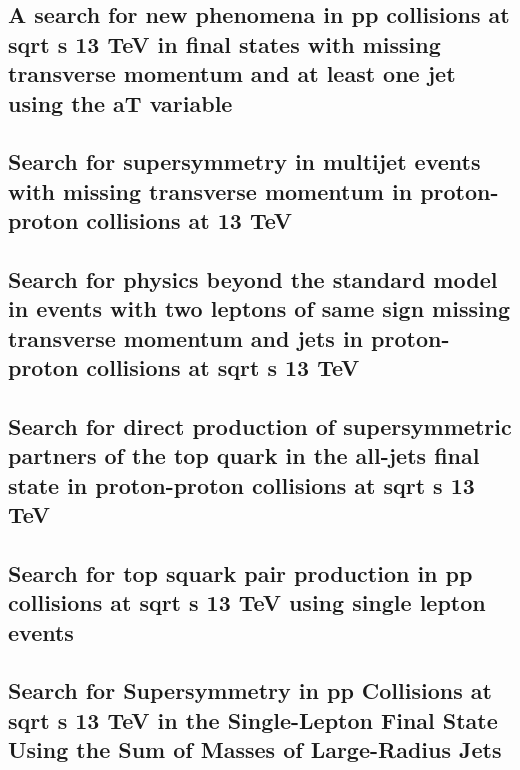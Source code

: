 \documentclass[a4paper, 11pt, twoside, openright]{report}
\begin{document}
\subsection{A search for new phenomena in pp collisions at sqrt s 13 TeV in final states with missing transverse momentum and at least one jet using the aT variable}


\subsection{Search for supersymmetry in multijet events with missing transverse momentum in proton-proton collisions at 13 TeV}


\subsection{Search for physics beyond the standard model in events with two leptons of same sign missing transverse momentum and jets in proton-proton collisions at sqrt s 13 TeV}


\subsection{Search for direct production of supersymmetric partners of the top quark in the all-jets final state in proton-proton collisions at sqrt s 13 TeV}


\subsection{Search for top squark pair production in pp collisions at sqrt s 13 TeV using single lepton events}


\subsection{Search for Supersymmetry in pp Collisions at sqrt s 13 TeV in the Single-Lepton Final State Using the Sum of Masses of Large-Radius Jets}

\end{document}
